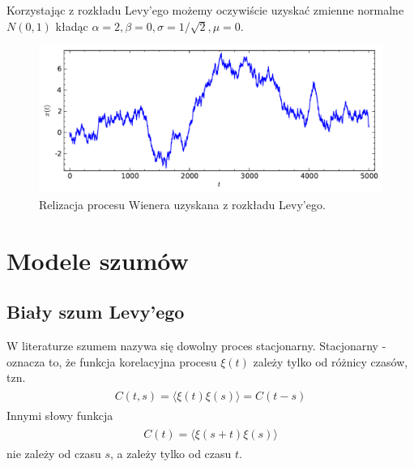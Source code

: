 \documentclass[a4paper,12pt,polish]{sphinxmanual}
\begin{document}
Korzystając z rozkładu Levy'ego możemy oczywiście uzyskać zmienne normalne
$N(0,1)$ kładąc $\alpha=2, \beta=0, \sigma = 1/\sqrt{2}, \mu=0$.
\begin{figure}[htbp]
\centering
\capstart

\includegraphics[width=0.800\linewidth]{sage_chIII02_04.pdf}
\caption{Relizacja procesu Wienera uzyskana z rozkładu Levy'ego.}\end{figure}


\section{Modele szumów}
\label{ch3/chIII031::doc}\label{ch3/chIII031:modele-szumow}

\subsection{Biały szum Levy'ego}
\label{ch3/chIII031:bialy-szum-levy-ego}
W literaturze szumem nazywa się dowolny proces stacjonarny. Stacjonarny - oznacza to, że
funkcja korelacyjna procesu $\xi(t)$ zależy tylko od różnicy czasów, tzn.
\label{ch3/chIII031:equation-eqn1}\begin{gather}
\begin{split}C(t, s) = \langle \xi(t) \xi(s) \rangle = C(t-s)\end{split}\label{ch3/chIII031-eqn1}
\end{gather}
Innymi słowy funkcja
\label{ch3/chIII031:equation-eqn2}\begin{gather}
\begin{split}C(t) = \langle \xi(s+t) \xi(s) \rangle\end{split}\label{ch3/chIII031-eqn2}
\end{gather}
nie zależy od czasu $s$, a zależy tylko od czasu $t$.
\end{document}
